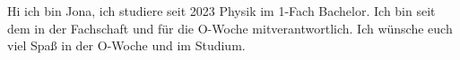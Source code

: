 \begin{multicols}{2}
{
Hi ich bin Jona, ich studiere seit 2023 Physik im 1-Fach Bachelor. Ich bin seit dem in der Fachschaft und für die O-Woche mitverantwortlich. 
Ich wünsche euch viel Spaß in der O-Woche und im Studium. 
}


\end{multicols}
